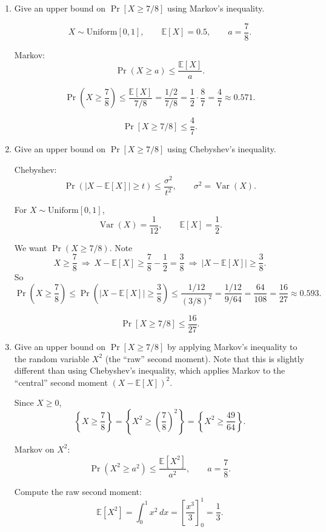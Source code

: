 \documentclass[10pt]{article}
\newcommand{\spara}[1]{\vspace{.5em}\noindent {\large\sffamily\textcolor{nyuOfficialPurple}{#1}}}
\newcommand{\E}{\mathbb{E}}
\DeclareMathOperator{\Var}{Var}
\begin{document}
\begin{enumerate}[label=\arabic*.]

	\item Give an upper bound on $\Pr[X \geq 7/8]$ using Markov's inequality.

\spara{Pr. 1.1}

\[
X\sim \text{Uniform}[0,1],
\qquad
\E[X]=0.5,
\qquad
a=\frac{7}{8}.
\]

Markov:
\[
\Pr(X\ge a)\le \frac{\E[X]}{a}.
\]

\[
\Pr\!\left(X\ge \frac{7}{8}\right)
\le
\frac{\E[X]}{7/8}
=
\frac{1/2}{7/8}
=
\frac{1}{2}\cdot \frac{8}{7}
=
\frac{4}{7}
\approx 0.571.
\]

\[
\boxed{\Pr[X\ge 7/8]\le \frac{4}{7}.}
\]


	\item Give an upper bound on $\Pr[X \geq 7/8]$ using Chebyshev's inequality.

\spara{Pr. 1.2}

Chebyshev:
\[
\Pr(|X-\E[X]|\ge t)\le \frac{\sigma^2}{t^2},
\qquad
\sigma^2=\Var(X).
\]

For $X\sim \text{Uniform}[0,1]$,
\[
\Var(X)=\frac{1}{12},
\qquad
\E[X]=\frac{1}{2}.
\]

We want $\Pr(X\ge 7/8)$. Note
\[
X\ge \frac{7}{8}
\ \Rightarrow\
X-\E[X]\ge \frac{7}{8}-\frac{1}{2}=\frac{3}{8}
\ \Rightarrow\
|X-\E[X]|\ge \frac{3}{8}.
\]
So
\[
\Pr\!\left(X\ge \frac{7}{8}\right)
\le
\Pr\!\left(|X-\E[X]|\ge \frac{3}{8}\right)
\le
\frac{1/12}{(3/8)^2}
=
\frac{1/12}{9/64}
=
\frac{64}{108}
=
\frac{16}{27}
\approx 0.593.
\]

\[
\boxed{\Pr[X\ge 7/8]\le \frac{16}{27}.}
\]


	\item Give an upper bound on $\Pr[X \geq 7/8]$ by applying Markov's inequality to the random variable $X^2$ (the ``raw'' second moment). Note that this is slightly different than using Chebyshev's inequality, which applies Markov to the ``central'' second moment $(X - \E[X])^2$.

\spara{Pr. 1.3}

Since $X\ge 0$,
\[
\left\{X\ge \frac{7}{8}\right\}
=
\left\{X^2 \ge \left(\frac{7}{8}\right)^2\right\}
=
\left\{X^2 \ge \frac{49}{64}\right\}.
\]

Markov on $X^2$:
\[
\Pr(X^2\ge a^2)\le \frac{\E[X^2]}{a^2},
\qquad
a=\frac{7}{8}.
\]

Compute the raw second moment:
\[
\E[X^2]=\int_0^1 x^2\,dx
=
\left[\frac{x^3}{3}\right]_0^1
=
\frac{1}{3}.
\]


\end{enumerate}
\end{document}
